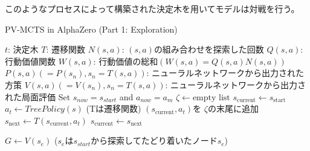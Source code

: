 	
このようなプロセスによって構築された決定木を用いてモデルは対戦を行う。
\newpage
\begin{algorithm}
    \caption{PV-MCTS in AlphaZero (Part 1: Exploration)}
    \label{alg:mcts-1}
    \begin{algorithmic}[1]
        \State $t$: 決定木
        \State $T$: 遷移関数
        \State $N(s, a)$: $(s, a)$の組み合わせを探索した回数
        \State $Q(s, a)$: 行動価値関数 
        \State $W(s, a)$: 行動価値の総和$(W(s, a)=Q(s, a)N(s, a))$
        \State $P(s, a)(=P(s_n), s_n=T(s, a))$: 
        \State ニューラルネットワークから出力された方策
        \State $V(s, a)(=V(s_n), s_n=T(s, a))$: 
        \State ニューラルネットワークから出力された局面評価
            \State Set $s_{now} = s_{start}$ and $a_{now} = a_m$
                \State $\zeta \gets \textrm{empty list}$
                \State $s_{\text{current}} \gets s_{\text{start}}$
                    \State $a_t \gets TreePolicy(s)$
                    \State (Tは遷移関数)
                    \State $(s_{\text{current}}, a_t)$を $\zeta $の末尾に追加
                    \State $s_{\text{next}} \gets T(s_{\text{current}}, a_t)$
                    \State $s_{\text{current}} \gets s_{\text{next}}$
                    
                \EndWhile
                \State $G \gets V(s_e)$ 
                \State($s_e$は$s_{start}$から探索してたどり着いたノード$s_e$)
                \State {}
            \EndFor
        \EndFunction
        
        
    \end{algorithmic}
\end{algorithm}
